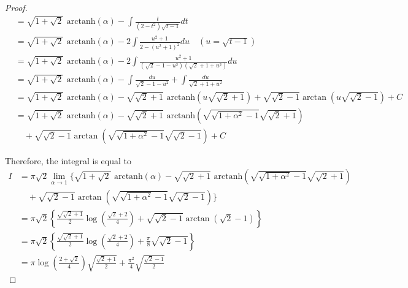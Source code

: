 \begin{proof}
\begin{align*}
&= \sqrt{1+\sqrt{2}}\text{ arctanh}(\alpha)-\int \frac{t}{(2-t^2)\sqrt{t-1}}dt \\
&=\sqrt{1+\sqrt{2}}\text{ arctanh}(\alpha)- 2\int \frac{u^2+1}{2-(u^2+1)^2}du\quad (u=\sqrt{t-1}) \\
&=\sqrt{1+\sqrt{2}}\text{ arctanh}(\alpha)- 2\int \frac{u^2+1}{(\sqrt{2}-1-u^2)(\sqrt{2}+1+u^2)}du \\
&= \sqrt{1+\sqrt{2}}\text{ arctanh}(\alpha)-\int\frac{du}{\sqrt{2}-1-u^2}+\int\frac{du}{\sqrt{2}+1+u^2} \\
&=\sqrt{1+\sqrt{2}}\text{ arctanh}(\alpha)-\sqrt{\sqrt{2}+1}\text{ arctanh}\left( u \sqrt{\sqrt{2}+1}\right)+\sqrt{\sqrt{2}-1}\arctan\left(u\sqrt{\sqrt{2}-1} \right) +C\\
&= \sqrt{1+\sqrt{2}}\text{ arctanh}(\alpha)-\sqrt{\sqrt{2}+1}\text{ arctanh}\left( \sqrt{\sqrt{1+\alpha^2}-1} \sqrt{\sqrt{2}+1}\right)\\ &\quad +\sqrt{\sqrt{2} -1}\arctan\left(\sqrt{\sqrt{1+\alpha^2}-1}\sqrt{\sqrt{2}-1} \right) +C
\end{align*}

Therefore, the integral is equal to
\begin{align*}
I &= \pi \sqrt{2} \lim_{\alpha\to 1}\Bigg\{ \sqrt{1+\sqrt{2}}\text{ arctanh}(\alpha)-\sqrt{\sqrt{2}+1}\text{ arctanh}\left( \sqrt{\sqrt{1+\alpha^2}-1} \sqrt{\sqrt{2}+1}\right)\\ &\quad +\sqrt{\sqrt{2} -1}\arctan\left(\sqrt{\sqrt{1+\alpha^2}-1}\sqrt{\sqrt{2}-1} \right) \Bigg\} \\
&= \pi\sqrt{2}\left\{\frac{\sqrt{\sqrt{2}+1}}{2}\log\left(\frac{\sqrt{2}+2}{4} \right) +\sqrt{\sqrt{2}-1}\arctan\left(\sqrt{2}-1 \right)\right\} \\
&= \pi\sqrt{2}\left\{\frac{\sqrt{\sqrt{2}+1}}{2}\log\left(\frac{\sqrt{2}+2}{4} \right) +\frac{\pi}{8}\sqrt{\sqrt{2}-1}\right\} \\
&= \pi \log\left( \frac{2+\sqrt{2}}{4}\right) \sqrt{\frac{\sqrt{2}+1}{2}}+\frac{\pi^2}{4}\sqrt{\frac{\sqrt{2}-1}{2}}
\end{align*}
\end{proof}